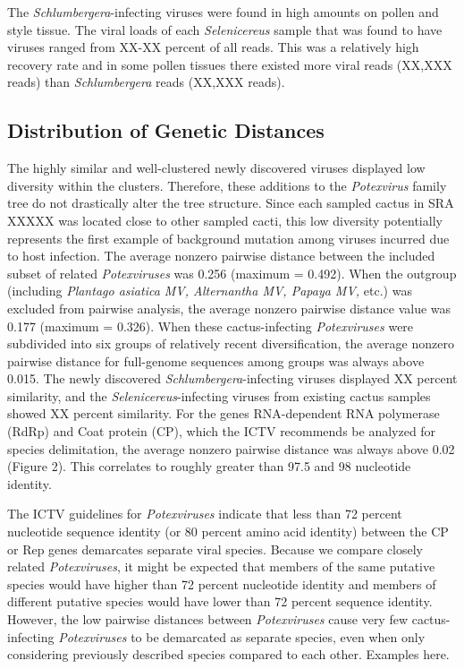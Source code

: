 \documentclass[11pt,letterpaper,titlepage]{article}
\begin{document}
\begin{linenumbers}
The \textit{Schlumbergera}-infecting viruses were found in high amounts on pollen and style tissue.
The viral loads of each \textit{Selenicereus} sample that was found to have viruses ranged from XX-XX percent of all reads.
This was a relatively high recovery rate and in some pollen tissues there existed more viral reads (XX,XXX reads) than \textit{Schlumbergera} reads (XX,XXX reads).

\subsection*{Distribution of Genetic Distances}
The highly similar and well-clustered newly discovered viruses displayed low diversity within the clusters.
Therefore, these additions to the \textit{Potexvirus} family tree do not drastically alter the tree structure.
Since each sampled cactus in SRA XXXXX was located close to other sampled cacti, this low diversity potentially represents the first example of background mutation among viruses incurred due to host infection.
The average nonzero pairwise distance between the included subset of related \textit{Potexviruses} was 0.256 (maximum = 0.492). 
When the outgroup (including \textit{Plantago asiatica MV, Alternantha MV, Papaya MV,} etc.) was excluded from pairwise analysis, the average nonzero pairwise distance value was 0.177 (maximum = 0.326). 
When these cactus-infecting \textit{Potexviruses} were subdivided into six groups of relatively recent diversification, the average nonzero pairwise distance for full-genome sequences among groups was always above 0.015. 
The newly discovered \textit{Schlumbergera}-infecting viruses displayed XX percent similarity, and the \textit{Selenicereus}-infecting viruses from existing cactus samples showed XX percent similarity.
For the genes RNA-dependent RNA polymerase (RdRp) and Coat protein (CP), which the ICTV recommends be analyzed for species delimitation, the average nonzero pairwise distance was always above 0.02 (Figure 2). 
This correlates to roughly greater than 97.5 and 98 nucleotide identity. 


The ICTV guidelines for \textit{Potexviruses} indicate that less than 72 percent nucleotide sequence identity (or 80 percent amino acid identity) between the CP or Rep genes demarcates separate viral species. %
Because we compare closely related \textit{Potexviruses}, it might be expected that members of the same putative species would have higher than 72 percent nucleotide identity and members of different putative species would have lower than 72 percent sequence identity.
However, the low pairwise distances between \textit{Potexviruses} cause very few cactus-infecting \textit{Potexviruses} to be demarcated as separate species, even when only considering previously described species compared to each other.
Examples here.



\end{linenumbers}
\end{document}
